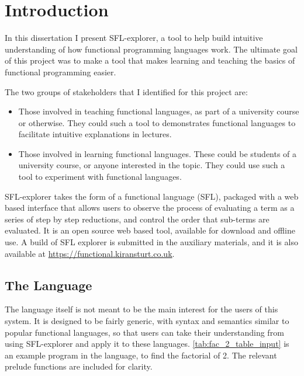 \chapter{Introduction}
\label{chap:context}
In this dissertation I present SFL-explorer, a tool to help build intuitive understanding of how functional programming languages work. The ultimate goal of this project was to make a tool that makes learning and teaching the basics of functional programming easier. 

The two groups of stakeholders that I identified for this project are:
\begin{itemize}
  \item Those involved in teaching functional languages, as part of a university course or otherwise. They could such a tool to demonstrates functional languages to facilitate intuitive explanations in lectures.
  \item Those involved in learning functional languages. These could be students of a university course, or anyone interested in the topic. They could use such a tool to experiment with functional languages. 
\end{itemize}

SFL-explorer takes the form of a functional language (\ac{SFL}), packaged with a web based interface that allows users to observe the process of evaluating a term as a series of step by step reductions, and control the order that sub-terms are evaluated.  It is an open source web based tool, available for download and offline use. A build of SFL explorer is submitted in the auxiliary materials, and it is also available at \href{https://functional.kiransturt.co.uk}{https://functional.kiransturt.co.uk}.

\section{The Language}
The language itself is not meant to be the main interest for the users of this system. It is designed to be fairly generic, with syntax and semantics similar to popular functional languages, so that users can take their understanding from using SFL-explorer and apply it to these languages. \ref{tab:fac_2_table_input} is an example program in the language, to find the factorial of 2. The relevant prelude functions are included for clarity.

